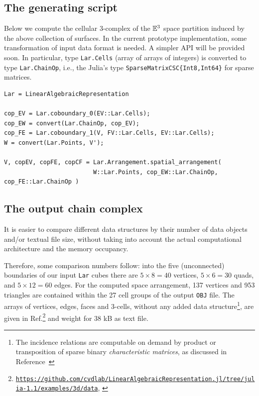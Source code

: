 \documentclass[11pt, oneside]{amsart}   	%
\begin{document}
\subsection{The generating script}
Below we  compute the cellular 3-complex of the $\mathbb{E}^3$ space partition induced by the above collection of surfaces.
In the current prototype implementation, some transformation of input data format is needed. A simpler  API will be provided soon. In particular, type \texttt{Lar.Cells} (array of arrays of integers) is converted to type \texttt{Lar.ChainOp}, i.e., the Julia's type \texttt{SparseMatrixCSC\{Int8,Int64\}} for  sparse matrices.

\vspace{2mm}
{\small
\begin{verbatim}
Lar = LinearAlgebraicRepresentation

cop_EV = Lar.coboundary_0(EV::Lar.Cells);
cop_EW = convert(Lar.ChainOp, cop_EV);
cop_FE = Lar.coboundary_1(V, FV::Lar.Cells, EV::Lar.Cells);
W = convert(Lar.Points, V');

V, copEV, copFE, copCF = Lar.Arrangement.spatial_arrangement(
                         W::Lar.Points, cop_EW::Lar.ChainOp, cop_FE::Lar.ChainOp )
\end{verbatim}}
\vspace{2mm}



\subsection{The output chain complex}


It is easier to compare different data structures by their number of data objects and/or textual file size, without taking into account the actual computational architecture and the memory occupancy.

Therefore, some comparison numbers follow: into the five (unconnected) boundaries of our input \texttt{Lar} cubes there are $5\times 8=40$ vertices, $5\times 6=30$ quads, and $5\times 12=60$ edges. For the computed space arrangement, 137 vertices and 953 triangles are contained within the 27 cell groups of the output \texttt{OBJ} file. The arrays of vertices, edges, faces and 3-cells, without any added data structure\footnote{The incidence relations are computable on demand by product or transposition of sparse binary \emph{characteristic matrices}, as discussed in Reference~\cite{TSAS}}, are given in Ref.\footnote{{\scriptsize
\texttt{\href{https://github.com/cvdlab/LinearAlgebraicRepresentation.jl/tree/julia-1.1/examples/3d/data}{https://github.com/cvdlab/LinearAlgebraicRepresentation.jl/tree/julia-1.1/examples/3d/data}},
}
} and weight for 38 kB as text file.
\end{document}
